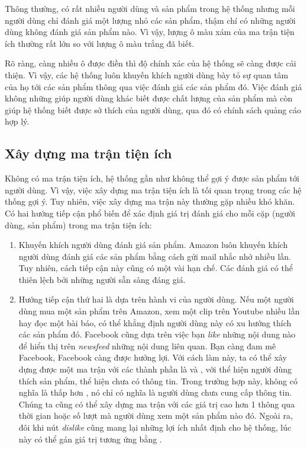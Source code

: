 Thông thường, có rất nhiều người dùng và sản phẩm trong hệ thống nhưng mỗi
người dùng chỉ đánh giá một lượng nhỏ các sản phẩm,
thậm chí có những người dùng không đánh giá sản phẩm nào. Vì vậy, lượng ô
màu xám của ma trận tiện ích thường rất lớn so với lượng ô màu trắng đã biết. 

Rõ ràng, càng nhiều ô được điền thì độ chính xác của hệ thống sẽ càng được cải
thiện. Vì vậy, các hệ thống luôn khuyến khích người dùng {bày tỏ} sự quan tâm
của họ tới các sản phẩm thông qua việc đánh giá các sản phẩm đó. Việc đánh giá
không những giúp người dùng khác biết được chất lượng của sản phẩm mà còn giúp
hệ thống {biết} được sở thích của người dùng, qua đó có chính sách quảng cáo hợp
lý.
 
 
\subsection{Xây dựng ma trận tiện ích}
 
Không có ma trận tiện ích, hệ thống gần như không thể gợi ý được sản phẩm tới
người dùng. Vì vậy, việc xây dựng ma trận tiện ích là tối quan trọng trong các
hệ thống gợi ý. Tuy nhiên, việc xây dựng ma trận này thường gặp nhiều khó khăn.
Có hai hướng tiếp cận phổ biến để xác định giá trị đánh giá cho mỗi cặp (người
dùng, sản phẩm) trong ma trận tiện ích:
\vspace{-0.25cm}
\begin{enumerate}
    \item Khuyến khích người dùng đánh giá sản phẩm. Amazon luôn
    khuyến khích người dùng đánh giá các sản phẩm bằng cách gửi mail nhắc nhở
    nhiều lần. Tuy nhiên, cách tiếp cận này cũng có một vài hạn chế. Các đánh
    giá có thể thiên lệch bởi những người sẵn sàng đáng giá.
     
    \item Hướng tiếp cận thứ hai là dựa trên hành vi của người dùng. Nếu một
    người dùng mua một sản phẩm trên Amazon, xem một clip trên Youtube
    nhiều lần hay đọc một bài báo, có thể khẳng định người dùng
    này {có xu hướng} thích các sản phẩm đó. Facebook cũng dựa trên việc
    bạn \textit{like} những nội dung nào để hiển thị trên \textit{newsfeed}  những nội dung liên quan. Bạn càng đam mê Facebook, Facebook càng được
    hưởng lợi. Với cách làm này, ta có thể xây dựng được một ma
    trận với các thành phần là  và , với
     thể hiện người dùng thích sản phẩm,
     thể hiện chưa có thông tin. Trong trường hợp này,
     không có nghĩa là thấp hơn , nó chỉ có
    nghĩa là người dùng chưa cung cấp thông tin. Chúng ta cũng có thể xây
    dựng ma trận với các giá trị cao hơn 1 thông qua thời gian hoặc số lượt mà
    người dùng xem một sản phẩm nào đó. Ngoài ra, đôi khi nút
    \textit{dislike}
    cũng mang lại những lợi ích nhất định cho hệ thống, lúc này có thể gán giá
    trị tương ứng bằng
    .
\end{enumerate}
 
